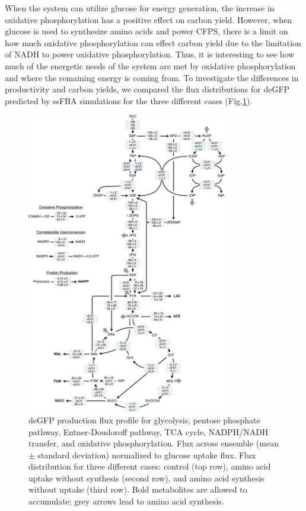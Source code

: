 \documentclass[journal=asbcd6,manuscript=article]{achemso}
\begin{document}
When the system can utilize glucose for energy generation, the increase in oxidative phosphorylation has a positive effect on carbon yield.
However, when glucose is used to synthesize amino acids and power CFPS, there is a limit on how much oxidative phosphorylation can effect carbon yield due to the limitation of NADH to power oxidative phosphorylation.
Thus, it is interesting to see how much of the energetic needs of the system are met by oxidative phosphorylation and where the remaining energy is coming from.
To investigate the differences in productivity and carbon yields, we compared the flux distributions for deGFP predicted by ssFBA simulations for the three different cases (Fig.\ref{fig:flux}).
\begin{figure}[t!]
\includegraphics[width=0.78\textwidth]{./Figures/flux.pdf}
\caption{deGFP production flux profile for glycolysis, pentose phosphate pathway, Entner-Doudoroff pathway, TCA cycle, NADPH/NADH transfer, and oxidative phosphorylation. Flux across ensemble (mean $\pm$ standard deviation) normalized to glucose uptake flux. Flux distribution for three different cases: control (top row), amino acid uptake without synthesis (second row), and amino acid synthesis without uptake (third row). Bold metabolites are allowed to accumulate; grey arrows lead to amino acid synthesis.}
\label{fig:flux}
\end{figure}
\end{document}
